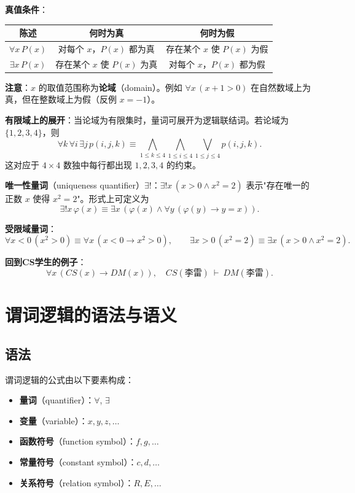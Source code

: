\documentclass[UTF8,11pt,a4paper]{ctexbook}   %
\theoremstyle{definition}
\begin{document}
\textbf{真值条件}：
\begin{center}
\begin{tabular}{|c|c|c|}
\hline
\textbf{陈述} & \textbf{何时为真} & \textbf{何时为假} \\
\hline
$\forall x\,P(x)$ & 对每个 $x$，$P(x)$ 都为真 & 存在某个 $x$ 使 $P(x)$ 为假 \\
\hline
$\exists x\,P(x)$ & 存在某个 $x$ 使 $P(x)$ 为真 & 对每个 $x$，$P(x)$ 都为假 \\
\hline
\end{tabular}
\end{center}

\textbf{注意}：$x$ 的取值范围称为\textbf{论域}（domain）。例如 $\forall x\,(x+1>0)$ 在自然数域上为真，但在整数域上为假（反例 $x=-1$）。

\textbf{有限域上的展开}：当论域为有限集时，量词可展开为逻辑联结词。若论域为 $\{1,2,3,4\}$，则
\[
\forall k\,\forall i\,\exists j\,p(i,j,k)\equiv\bigwedge_{1\leq k\leq 4}\bigwedge_{1\leq i\leq 4}\bigvee_{1\leq j\leq 4}p(i,j,k).
\]
这对应于 $4\times 4$ 数独中每行都出现 $1,2,3,4$ 的约束。

\textbf{唯一性量词}（uniqueness quantifier）$\exists!$：$\exists!x\,(x>0\land x^2=2)$ 表示"存在唯一的正数 $x$ 使得 $x^2=2$"。形式上可定义为
\[
\exists!x\,\varphi(x)\equiv\exists x\,(\varphi(x)\land\forall y\,(\varphi(y)\to y=x)).
\]

\textbf{受限域量词}：
\[
\forall x<0\,(x^2>0)\equiv\forall x\,(x<0\to x^2>0),\qquad
\exists x>0\,(x^2=2)\equiv\exists x\,(x>0\land x^2=2).
\]

\textbf{回到CS学生的例子}：
\[
\forall x\,(CS(x)\to DM(x)),\quad CS(\text{李雷})\ \vdash\ DM(\text{李雷}).
\]

\section{谓词逻辑的语法与语义}

\subsection{语法}

谓词逻辑的公式由以下要素构成：
\begin{itemize}
    \item \textbf{量词}（quantifier）：$\forall$, $\exists$
    \item \textbf{变量}（variable）：$x, y, z, \ldots$
    \item \textbf{函数符号}（function symbol）：$f, g, \ldots$
    \item \textbf{常量符号}（constant symbol）：$c, d, \ldots$
    \item \textbf{关系符号}（relation symbol）：$R, E, \ldots$
\end{itemize}
\end{document}
